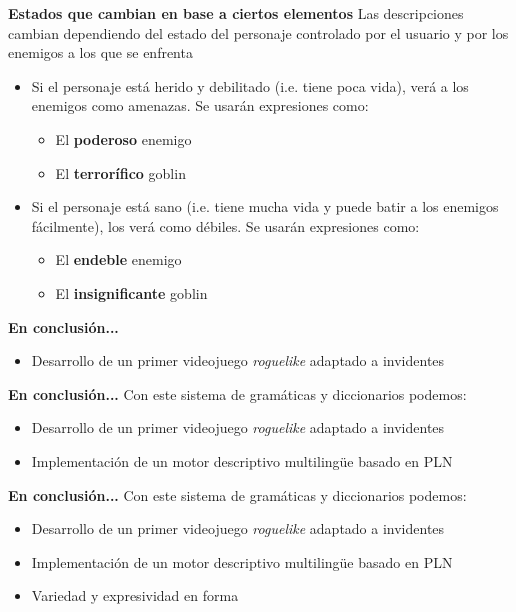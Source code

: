 \begin{frame}[c]{\textbf{Estados que cambian en base a ciertos elementos}}
	Las descripciones cambian dependiendo del estado del personaje controlado por el usuario y por los enemigos a los que se enfrenta
	\begin{itemize}
		\item Si el personaje está herido y debilitado (i.e. tiene poca vida), verá a los enemigos como amenazas. Se usarán expresiones como:
		\begin{itemize}
			\item El \textbf{poderoso} enemigo
			\item El \textbf{terrorífico} goblin
		\end{itemize}
		\item Si el personaje está sano (i.e. tiene mucha vida y puede batir a los enemigos fácilmente), los verá como débiles. Se usarán expresiones como:
		\begin{itemize}
			\item El \textbf{endeble} enemigo
			\item El \textbf{insignificante} goblin
		\end{itemize}
	\end{itemize}
\end{frame}


\begin{tframe}{\textbf{En conclusión...}}
	\begin{itemize}
		\item<+-| alert@+> Desarrollo de un primer videojuego \textit{roguelike} adaptado a invidentes
	\end{itemize}
\end{tframe}

\begin{tframe}{\textbf{En conclusión...}}
	Con este sistema de gramáticas y diccionarios podemos:
	\begin{itemize}
		\item Desarrollo de un primer videojuego \textit{roguelike} adaptado a invidentes
		\item<+-| alert@+> Implementación de un motor descriptivo multilingüe basado en PLN
	\end{itemize}
\end{tframe}

\begin{tframe}{\textbf{En conclusión...}}
	Con este sistema de gramáticas y diccionarios podemos:
	\begin{itemize}
		\item Desarrollo de un primer videojuego \textit{roguelike} adaptado a invidentes
		\item Implementación de un motor descriptivo multilingüe basado en PLN
		\item<+-| alert@+> Variedad y expresividad en forma
	\end{itemize}
\end{tframe}

